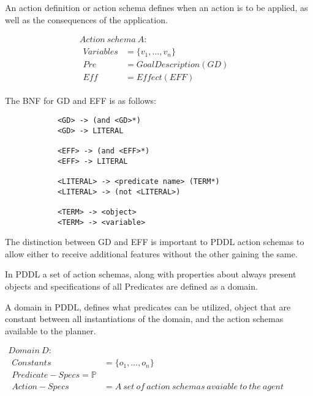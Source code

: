 \documentclass[../Master.tex]{subfiles}
\begin{document}
\begin{definition} \label{def:lrn:action-spec-def}
		An action definition or action schema defines when an action is to be applied, as well as the consequences of the application.
		
    \begin{equation*}
		\begin{array}{ll}
		Action~schema~A: & \\
		
		\begin{array}{ll}
		Variables & = \{v_1,\dots,v_n\}			 \\  
		Pre	& = Goal Description(GD) \\
		Eff & = Effect(EFF) 
		\end{array}
		\end{array}
    \end{equation*}
		
		The BNF for GD and EFF is as follows:
		
		\begin{lstlisting}
            <GD> -> (and <GD>*) 
            <GD> -> LITERAL
            
            <EFF> -> (and <EFF>*)
            <EFF> -> LITERAL
            
            <LITERAL> -> <predicate name> (TERM*)
            <LITERAL> -> (not <LITERAL>)
            
            <TERM> -> <object>
            <TERM> -> <variable>
		\end{lstlisting}
		
		The distinction between GD and EFF is important to PDDL action schemas to allow either to receive additional features without the other gaining the same.
	\end{definition}
	
In PDDL a set of action schemas, along with properties about always present objects and specifications of all Predicates are defined as a domain.

\begin{definition} A domain in PDDL, defines what predicates can be utilized, object that are constant between all instantiations of the domain, and the action schemas available to the planner.
	
$
\begin{array}{ll}
Domain~D: & \\

\begin{array}{ll}
Constants & = \{o_1,\dots,o_n\}			 \\  
Predicate-Specs = \mathbb{P} \\
Action-Specs & = A~set~of~action~schemas~avaiable~to~the~agent \\
\end{array}
\end{array}$
\end{definition}
\end{document}
